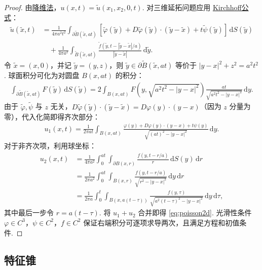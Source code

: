 \documentclass[../../main.tex]{subfiles}%
\begin{document}
\begin{proof}
由\hyperref[proposition:多维波动方程降维法]{降维法}，$u(x,t)=\tilde{u}(x_1,x_2,0,t)$. 对三维延拓问题应用 \hyperref[theorem:PDE-Kirchhoff公式]{Kirchhoff公式}：
\begin{align*}
\tilde{u}(\tilde{x},t)&=\frac{1}{4\pi a^2t^2}\int_{\partial \tilde{B}(\tilde{x},at)}[\tilde{\varphi}(\tilde{y})+D\tilde{\varphi}(\tilde{y})\cdot(\tilde{y}-\tilde{x})+t\tilde{\psi}(\tilde{y})]\,\mathrm{d}S(\tilde{y}) \\
&\quad+\frac{1}{4\pi a^2}\int_{\tilde{B}(\tilde{x},at)}\frac{\tilde{f}(\tilde{y},t-|\tilde{y}-\tilde{x}|/a)}{|\tilde{y}-\tilde{x}|}\,\mathrm{d}\tilde{y}.
\end{align*}
令 $\tilde{x}=(x,0)$，并记 $\tilde{y}=(y,z)$，则 $\tilde{y}\in\partial\tilde{B}(\tilde{x},at)$ 等价于 $|y-x|^2+z^2=a^2t^2$. 球面积分可化为对圆盘 $B(x,at)$ 的积分：
\begin{align*}
\int_{\partial\tilde{B}(\tilde{x},at)}F(\tilde{y})\,\mathrm{d}S(\tilde{y})
=2\int_{B(x,at)}F(y,\sqrt{a^2t^2-|y-x|^2})\frac{at}{\sqrt{a^2t^2-|y-x|^2}}\,\mathrm{d}y.
\end{align*}
由于 $\tilde{\varphi},\tilde{\psi}$ 与 $z$ 无关，$D\tilde{\varphi}(\tilde{y})\cdot(\tilde{y}-\tilde{x})=D\varphi(y)\cdot(y-x)$（因为 $z$ 分量为零），代入化简即得齐次部分：
\begin{align*}
u_1(x,t)=\frac{1}{2\pi at}\int_{B(x,at)}\frac{\varphi(y)+D\varphi(y)\cdot(y-x)+t\psi(y)}{\sqrt{(at)^2-|y-x|^2}}\,\mathrm{d}y.
\end{align*}
对于非齐次项，利用球坐标：
\begin{align*}
u_2(x,t)&=\frac{1}{4\pi a^2}\int_0^{at}\int_{\partial B(x,r)}\frac{f(y,t-r/a)}{r}\,\mathrm{d}S(y)\,\mathrm{d}r \\
&=\frac{1}{2\pi a^2}\int_0^{at}\int_{B(x,r)}\frac{f(y,t-r/a)}{\sqrt{r^2-|y-x|^2}}\,\mathrm{d}y\,\mathrm{d}r \\
&=\frac{1}{2\pi a}\int_0^t\int_{B(x,a(t-\tau))}\frac{f(y,\tau)}{\sqrt{a^2(t-\tau)^2-|y-x|^2}}\,\mathrm{d}y\,\mathrm{d}\tau,
\end{align*}
其中最后一步令 $r=a(t-\tau)$. 将 $u_1+u_2$ 合并即得 \eqref{eq:poisson2d}. 光滑性条件 $\varphi\in C^3$，$\psi\in C^2$，$f\in C^2$ 保证右端积分可逐项求导两次，且满足方程和初值条件.
\end{proof}

\subsection{特征锥}
\end{document}
